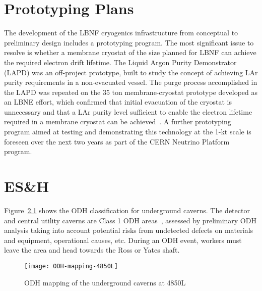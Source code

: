 \chapter{Prototyping Plans}
\label{sec:cryo-cryosys-proto-plans}


The development of the LBNF cryogenics infrastructure from conceptual 
to preliminary design includes a prototyping program. The most 
significant issue to resolve is whether a membrane cryostat of
the size planned for LBNF can achieve the required electron drift lifetime. 
The Liquid Argon Purity Demonstrator (LAPD) was an 
off-project prototype, built to study the concept of achieving
LAr purity requirements in a non-evacuated vessel. 
The purge process accomplished in the LAPD was 
repeated on the 35 ton membrane-cryostat prototype 
developed as an LBNE effort, which confirmed that initial 
evacuation of the cryostat is unnecessary and that 
a LAr purity level sufficient to enable the electron lifetime 
required in a membrane cryostat can be achieved~\cite{Montanari:2013/06/13aqa}.
A further prototyping program aimed at testing and demonstrating 
this technology at the 1-kt scale is foreseen over the
next two years as part of the CERN Neutrino Platform program.

\chapter{ES\&H}
\label{sec:cryo-cryosys-esh}

Figure~\ref{fig:ODH-mapping-4850L} shows the ODH classification for
underground caverns. The detector and central utility caverns
are Class 1 ODH areas~\cite{feshm},
assessed by preliminary ODH analysis taking into account
potential risks from undetected defects on materials
and equipment, operational causes, etc.
During an ODH event, workers must leave the area and head towards the Ross or Yates shaft.

\begin{figure}[htbp]
\centering
\texttt{[image: ODH-mapping-4850L]}
\caption{ODH mapping of the underground caverns at 4850L} 
\label{fig:ODH-mapping-4850L}
\end{figure}

